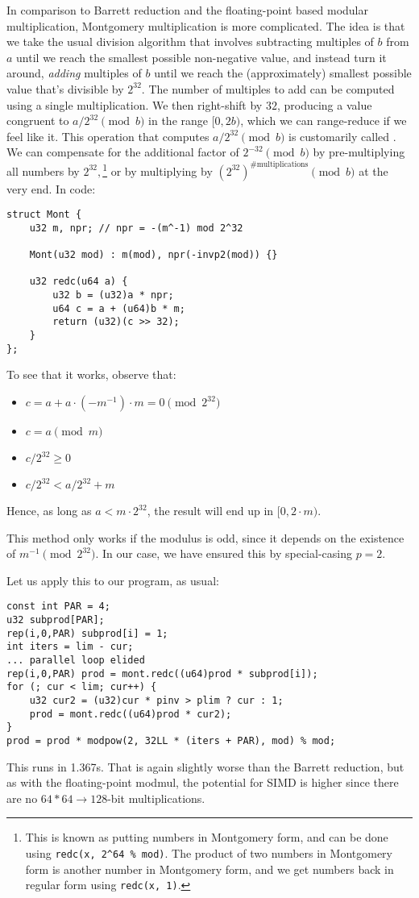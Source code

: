 In comparison to Barrett reduction and the floating-point based modular multiplication, Montgomery multiplication is more complicated.
The idea is that we take the usual division algorithm that involves subtracting multiples of $b$ from $a$ until we reach the smallest possible non-negative value, and instead turn it around, \emph{adding} multiples of $b$ until we reach the (approximately) smallest possible value that's divisible by $2^{32}$.
The number of multiples to add can be computed using a single multiplication.
We then right-shift by $32$, producing a value congruent to $a / 2^{32} \pmod b$ in the range $[0, 2b)$, which we can range-reduce if we feel like it.
This operation that computes $a / 2^{32} \pmod b$ is customarily called \verb@redc@.
We can compensate for the additional factor of $2^{-32} \pmod b$ by pre-multiplying all numbers by $2^{32},$\footnote{
This is known as putting numbers in Montgomery form, and can be done using \texttt{redc(x, 2\^{}64 \% mod)}.
The product of two numbers in Montgomery form is another number in Montgomery form, and we get numbers back in regular form using \texttt{redc(x, 1)}.
} or by multiplying by $(2^{32})^{\text{\#multiplications}} \pmod b$ at the very end.
In code:

\begin{lstlisting}
struct Mont {
	u32 m, npr; // npr = -(m^-1) mod 2^32

	Mont(u32 mod) : m(mod), npr(-invp2(mod)) {}

	u32 redc(u64 a) {
		u32 b = (u32)a * npr;
		u64 c = a + (u64)b * m;
		return (u32)(c >> 32);
	}
};
\end{lstlisting}

To see that it works, observe that:
\begin{itemize}
  \item $c = a + a \cdot (-m^{-1}) \cdot m = 0 \pmod{2^{32}}$
  \item $c = a \pmod{m}$
  \item $c/2^{32} \ge 0$
  \item $c/2^{32} < a/2^{32} + m$
\end{itemize}
Hence, as long as $a < m\cdot 2^{32}$, the result will end up in $[0, 2\cdot m)$.

This method only works if the modulus is odd, since it depends on the existence of $m^{-1} \pmod{2^{32}}$. In our case, we have ensured this by special-casing $p = 2$.

Let us apply this to our program, as usual:
\begin{lstlisting}
const int PAR = 4;
u32 subprod[PAR];
rep(i,0,PAR) subprod[i] = 1;
int iters = lim - cur;
... parallel loop elided
rep(i,0,PAR) prod = mont.redc((u64)prod * subprod[i]);
for (; cur < lim; cur++) {
	u32 cur2 = (u32)cur * pinv > plim ? cur : 1;
	prod = mont.redc((u64)prod * cur2);
}
prod = prod * modpow(2, 32LL * (iters + PAR), mod) % mod;
\end{lstlisting}
This runs in 1.367s. That is again slightly worse than the Barrett reduction, but as with the floating-point modmul, the potential for SIMD is higher since there are no \mbox{$64*64\rightarrow128$}-bit multiplications.

